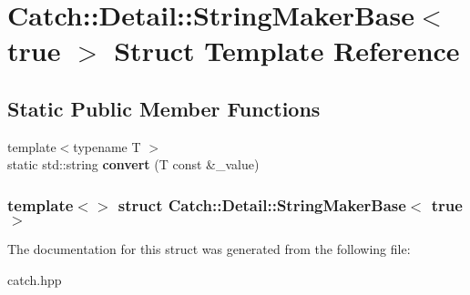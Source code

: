 \hypertarget{structCatch_1_1Detail_1_1StringMakerBase_3_01true_01_4}{
\section{Catch::Detail::StringMakerBase$<$ true $>$ Struct Template Reference}
\label{structCatch_1_1Detail_1_1StringMakerBase_3_01true_01_4}
}
\subsection*{Static Public Member Functions}
\begin{DoxyCompactItemize}
\item 
\hypertarget{structCatch_1_1Detail_1_1StringMakerBase_3_01true_01_4_ab19a895b274ca695d2a2ab8c315857c0}{
{\footnotesize template$<$typename T $>$ }\\static std::string {\bfseries convert} (T const \&\_\-value)}
\label{structCatch_1_1Detail_1_1StringMakerBase_3_01true_01_4_ab19a895b274ca695d2a2ab8c315857c0}

\end{DoxyCompactItemize}
\subsubsection*{template$<$$>$ struct Catch::Detail::StringMakerBase$<$ true $>$}



The documentation for this struct was generated from the following file:\begin{DoxyCompactItemize}
\item 
catch.hpp\end{DoxyCompactItemize}
